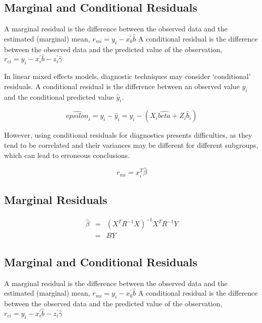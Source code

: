 \documentclass[main.tex]{subfiles}
\begin{document}
	\subsection{Marginal and Conditional Residuals}
	
	A marginal residual is the difference between the observed data and the estimated (marginal) mean, $r_{mi} = y_i - x_0^{\prime} \hat{b}$
	A conditional residual is the difference between the observed data and the predicted value of the observation,
	$r_{ci} = y_i - x_i^{\prime} \hat{b} - z_i^{\prime} \hat{\gamma}$
	
	In linear mixed effects models, diagnostic techniques may consider `conditional' residuals. A conditional residual is the difference between an observed value $y_{i}$ and the conditional predicted value $\hat{y}_{i} $.
	
	\[ \hat{epsilon}_{i} = y_{i} - \hat{y}_{i} = y_{i} - ( X_{i}\hat{beta} + Z_{i}\hat{b}_{i}) \]
	
	However, using conditional residuals for diagnostics presents difficulties, as they tend to be correlated and their variances may be different for different subgroups, which can lead to erroneous conclusions.
	
	
	
	
	
	
	
	\begin{equation}
	r_{mi}=x^{T}_{i}\hat{\beta}
	\end{equation}
	
	\subsection{Marginal Residuals}
	\begin{eqnarray}
	\hat{\beta} &=& (X^{T}R^{-1}X)^{-1}X^{T}R^{-1}Y \nonumber \\
	&=& BY \nonumber
	\end{eqnarray}
	\subsection{Marginal and Conditional Residuals}
	
	
	A marginal residual is the difference between the observed data and the estimated (marginal) mean, $r_{mi} = y_i - x_0^{\prime} \hat{b}$
	A conditional residual is the difference between the observed data and the predicted value of the observation,
	$r_{ci} = y_i - x_i^{\prime} \hat{b} - z_i^{\prime} \hat{\gamma}$
	
\end{document}
